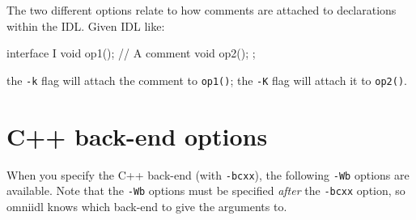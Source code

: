 \documentclass[11pt,twoside,a4paper]{book}
\newcommand{\op}[1]{\texttt{#1()}}
\newcommand{\cmdline}[1]{\texttt{#1}}
\begin{document}
The two different options relate to how comments are attached to
declarations within the IDL. Given IDL like:

\begin{idllisting}
interface I {
  void op1();
  // A comment
  void op2();
};
\end{idllisting}

\noindent the \cmdline{-k} flag will attach the comment to \op{op1};
the \cmdline{-K} flag will attach it to \op{op2}.



\section{C++ back-end options}

When you specify the C++ back-end (with \cmdline{-bcxx}), the
following \cmdline{-Wb} options are available. Note that the
\cmdline{-Wb} options must be specified \emph{after} the
\cmdline{-bcxx} option, so omniidl knows which back-end to give the
arguments to.
\end{document}
